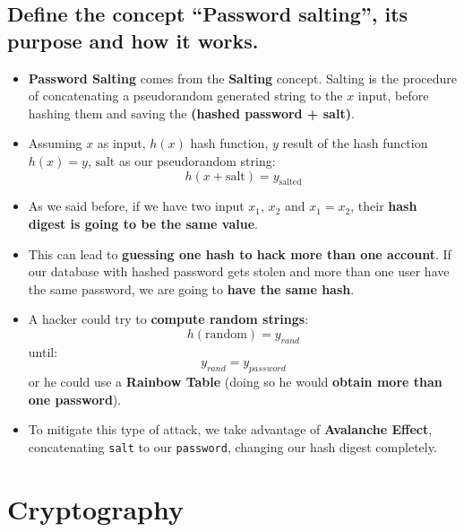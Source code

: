 \documentclass[9pt, letterpaper]{article}
\begin{document}
\subsection{Define the concept “Password salting”, its purpose and how it works.}
\begin{itemize}
	\item \textbf{Password Salting} comes from the \textbf{Salting} concept. Salting is the procedure of concatenating a pseudorandom generated string to the $x$ input, before hashing them and saving the \textbf{(hashed password + salt)}.
	\item Assuming $x$ as input, $h(x)$ hash function, $y$ result of the hash function $h(x)=y$, $\text{salt}$ as our pseudorandom string: $$h(x+\text{salt})=y_{\text{salted}}$$
	\item As we said before, if we have two input $x_1$, $x_2$ and $x_1=x_2$, their \textbf{hash digest is going to be the same value}.
	\item This can lead to \textbf{guessing one hash to hack more than one account}. If our database with hashed password gets stolen and more than one user have the same password, we are going to \textbf{have the same hash}.
	\item A hacker could try to \textbf{compute random strings}: $$h(\text{random})=y_{rand}$$ until: $$y_{rand} = y_{password}$$ or he could use a \textbf{Rainbow Table} (doing so he would \textbf{obtain more than one password}).
	\item To mitigate this type of attack, we take advantage of \textbf{Avalanche Effect}, concatenating {\tt salt} to our {\tt password}, changing our hash digest completely.
\end{itemize}

\newpage

\section{Cryptography}
\end{document}
